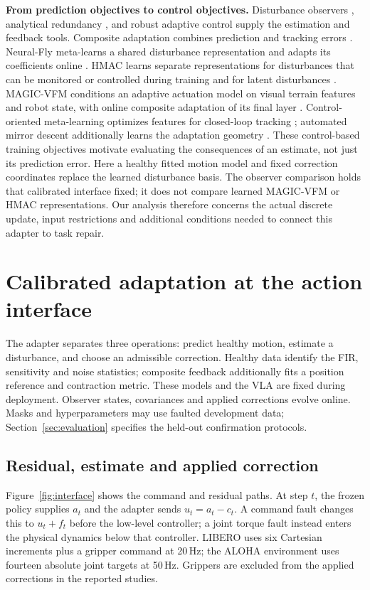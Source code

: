 \documentclass{article}
\begin{document}
\textbf{From prediction objectives to control objectives.} Disturbance observers
\citep{shim2021dob}, analytical redundancy \citep{isermann2005,chen1999fdi}, and robust
adaptive control \citep{ioannou1996} supply the estimation and feedback tools.
Composite adaptation combines prediction and tracking errors \citep{slotine1989composite}.
Neural-Fly meta-learns a shared disturbance
representation and adapts its coefficients online \citep{neuralfly}. HMAC learns separate
representations for disturbances that can be monitored or controlled during training
and for latent disturbances \citep{hmac2024}. MAGIC-VFM conditions an adaptive actuation model on visual terrain
features and robot state, with online composite adaptation of its final layer
\citep{magicvfm}. Control-oriented meta-learning optimizes features for closed-loop
tracking \citep{controlmeta2023}; automated mirror descent additionally learns
the adaptation geometry \citep{tang2025mirror}. These control-based training objectives
motivate evaluating the consequences of an estimate, not just its prediction error.
Here a healthy fitted motion model and fixed correction coordinates replace the learned
disturbance basis. The observer comparison holds that calibrated interface fixed; it does
not compare learned MAGIC-VFM or HMAC representations. Our analysis therefore concerns
the actual discrete update, input restrictions and additional conditions needed to connect
this adapter to task repair.

\section{Calibrated adaptation at the action interface}
\label{sec:framework}\label{sec:setting}
The adapter separates three operations: predict healthy motion, estimate a disturbance,
and choose an admissible correction. Healthy data identify the FIR, sensitivity and noise
statistics; composite feedback additionally fits a position reference and contraction metric.
These models and the VLA are fixed during deployment. Observer states, covariances and
applied corrections evolve online. Masks and hyperparameters may use faulted development
data; Section~\ref{sec:evaluation} specifies the held-out confirmation protocols.

\subsection{Residual, estimate and applied correction}
Figure~\ref{fig:interface} shows the command and residual paths. At step $t$, the frozen policy supplies $a_t$ and the adapter sends $u_t=a_t-c_t$.
A command fault changes this to $u_t+f_t$ before the low-level controller; a joint torque
fault instead enters the physical dynamics below that controller. LIBERO \citep{libero}
uses six Cartesian increments plus a gripper command at 20\,Hz; the ALOHA environment
\citep{aloha_act} uses fourteen absolute joint targets at
50\,Hz. Grippers are excluded from the applied corrections in the reported studies.
\end{document}
